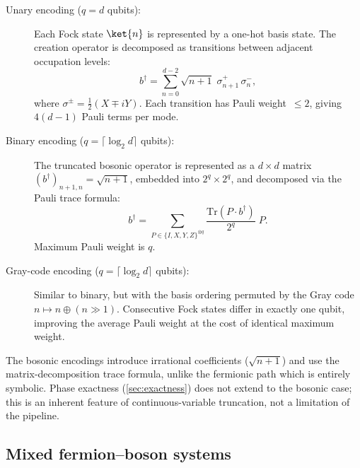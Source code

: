 \begin{description}
  \item[Unary encoding ($q = d$ qubits):] Each Fock state $\ket{n}$
    is represented by a one-hot basis state.  The creation operator
    is decomposed as transitions between adjacent occupation levels:
    \begin{equation}
      b^\dagger = \sum_{n=0}^{d-2} \sqrt{n+1}\; \sigma^+_{n+1}\,\sigma^-_n,
      \label{eq:unary}
    \end{equation}
    where $\sigma^\pm = \frac{1}{2}(X \mp iY)$.
    Each transition has Pauli weight~$\le 2$, giving
    $4(d-1)$ Pauli terms per mode.

  \item[Binary encoding ($q = \lceil\log_2 d\rceil$ qubits):]
    The truncated bosonic operator is represented as a $d \times d$
    matrix $(b^\dagger)_{n+1,n} = \sqrt{n+1}$, embedded into
    $2^q \times 2^q$, and decomposed via the Pauli trace formula:
    \begin{equation}
      b^\dagger = \sum_{P \in \{I,X,Y,Z\}^{\otimes q}}
        \frac{\mathrm{Tr}(P \cdot b^\dagger)}{2^q}\; P.
      \label{eq:binary}
    \end{equation}
    Maximum Pauli weight is $q$.

  \item[Gray-code encoding ($q = \lceil\log_2 d\rceil$ qubits):]
    Similar to binary, but with the basis ordering permuted by
    the Gray code $n \mapsto n \oplus (n \gg 1)$.  Consecutive
    Fock states differ in exactly one qubit, improving the average
    Pauli weight at the cost of identical maximum weight.
\end{description}

\begin{remark}
The bosonic encodings introduce irrational coefficients
($\sqrt{n+1}$) and use the matrix-decomposition trace formula, unlike
the fermionic path which is entirely symbolic.  Phase exactness
(\cref{sec:exactness}) does not extend to the bosonic case; this is an
inherent feature of continuous-variable truncation, not a limitation
of the pipeline.
\end{remark}

\subsection{Mixed fermion--boson systems}
\label{sec:ext-mixed}

